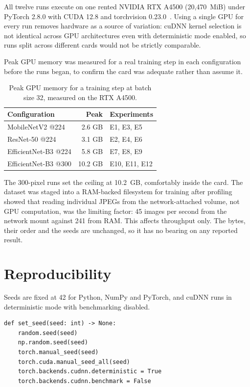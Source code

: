 All twelve runs execute on one rented NVIDIA RTX A4500 (20{,}470~MiB) under PyTorch
2.8.0 with CUDA 12.8 and torchvision 0.23.0~\cite{paszke2019pytorch}. Using a single GPU
for every run removes hardware as a source of variation: cuDNN kernel selection is not
identical across GPU architectures even with deterministic mode enabled, so runs split
across different cards would not be strictly comparable.

Peak GPU memory was measured for a real training step in each configuration before the
runs began, to confirm the card was adequate rather than assume it.

\begin{table}[htbp]
\centering
\caption{Peak GPU memory for a training step at batch size 32, measured on the RTX A4500.}
\label{tab:vram}
\small
\begin{tabular}{@{}lrl@{}}
\toprule
\textbf{Configuration} & \textbf{Peak} & \textbf{Experiments} \\
\midrule
MobileNetV2 @224     &  2.6 GB & E1, E3, E5 \\
ResNet-50 @224       &  3.1 GB & E2, E4, E6 \\
EfficientNet-B3 @224 &  5.8 GB & E7, E8, E9 \\
EfficientNet-B3 @300 & 10.2 GB & E10, E11, E12 \\
\bottomrule
\end{tabular}
\end{table}

The 300-pixel runs set the ceiling at 10.2~GB, comfortably inside the card. The dataset
was staged into a RAM-backed filesystem for training after profiling showed that reading
individual JPEGs from the network-attached volume, not GPU computation, was the limiting
factor: 45 images per second from the network mount against 241 from RAM. This affects
throughput only. The bytes, their order and the seeds are unchanged, so it has no bearing
on any reported result.

\section{Reproducibility}
\label{sec:method-repro}

Seeds are fixed at 42 for Python, NumPy and PyTorch, and cuDNN runs in deterministic
mode with benchmarking disabled.

\begin{lstlisting}[caption={Seeding, \texttt{src/ham10000/train.py}.}, label={lst:seed}]
def set_seed(seed: int) -> None:
    random.seed(seed)
    np.random.seed(seed)
    torch.manual_seed(seed)
    torch.cuda.manual_seed_all(seed)
    torch.backends.cudnn.deterministic = True
    torch.backends.cudnn.benchmark = False
\end{lstlisting}


